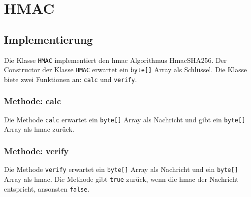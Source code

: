 \chapter{HMAC}

\section{Implementierung}
Die Klasse \texttt{HMAC} implementiert den \gls{hmac} Algorithmus \glqq HmacSHA256\grqq.
Der Constructor der Klasse \texttt{HMAC} erwartet ein \texttt{byte[]} Array als Schlüssel.
Die Klasse biete zwei Funktionen an: \texttt{calc} und \texttt{verify}.

\subsection{Methode: calc}
Die Methode \texttt{calc} erwartet ein \texttt{byte[]} Array als Nachricht und gibt ein \texttt{byte[]} Array als \gls{hmac} zurück.

\subsection{Methode: verify}
Die Methode \texttt{verify} erwartet ein \texttt{byte[]} Array als Nachricht und ein \texttt{byte[]} Array als \gls{hmac}.
Die Methode gibt \texttt{true} zurück, wenn die \gls{hmac} der Nachricht entspricht, ansonsten \texttt{false}.

